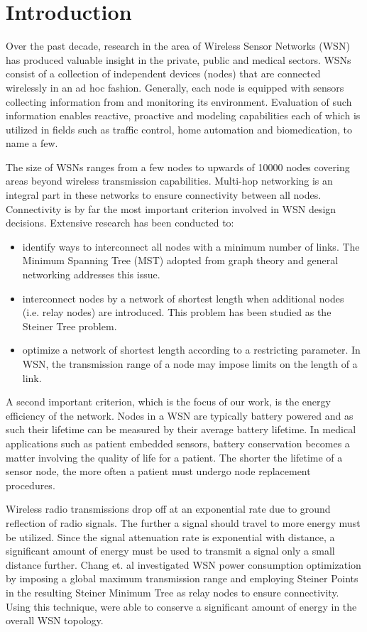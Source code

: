 \section{Introduction}

Over the past decade, research in the area of Wireless Sensor Networks (WSN) has produced valuable insight in the private, public and medical sectors. WSNs consist of a collection of independent devices (nodes) that are connected wirelessly in an ad hoc fashion. Generally, each node is equipped with sensors collecting information from and monitoring its environment. Evaluation of such information enables reactive, proactive and modeling capabilities each of which is utilized in fields such as traffic control, home automation and biomedication, to name a few.

The size of WSNs ranges from a few nodes to upwards of 10000 nodes covering areas beyond wireless transmission capabilities. Multi-hop networking is an integral part in these networks to ensure connectivity between all nodes. Connectivity is by far the most important criterion involved in WSN design decisions. Extensive research has been conducted to:
\begin{itemize}
\item identify ways to interconnect all nodes with a minimum number of links. The Minimum Spanning Tree (MST) adopted from graph theory and general networking addresses this issue.
\item interconnect nodes by a network of shortest length when additional nodes (i.e. relay nodes) are introduced. This problem has been studied as the Steiner Tree problem.
\item optimize a network of shortest length according to a restricting parameter. In WSN, the transmission range of a node may impose limits on the length of a link.
\end{itemize}

A second important criterion, which is the focus of our work, is the energy efficiency of the network. Nodes in a WSN are typically battery powered and as such their lifetime can be measured by their average battery lifetime. In medical applications such as patient embedded sensors, battery conservation becomes a matter involving the quality of life for a patient. The shorter the lifetime of a sensor node, the more often a patient must undergo node replacement procedures. 

Wireless radio transmissions drop off at an exponential rate due to ground reflection of radio signals. The further a signal should travel to more energy must be utilized. Since the signal attenuation rate is exponential with distance, a significant amount of energy must be used to transmit a signal only a small distance further. Chang et. al \cite{RelaySensor} investigated WSN power consumption optimization by imposing a global maximum transmission range and employing Steiner Points in the resulting Steiner Minimum Tree as relay nodes to ensure connectivity. Using this technique, \cite{RelaySensor} were able to conserve a significant amount of energy in the overall WSN topology.

